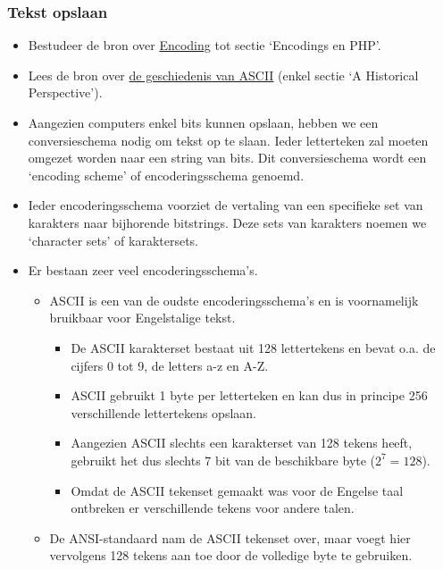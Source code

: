 \documentclass[]{tufte-book}
\providecommand{\tightlist}{%
  \setlength{\itemsep}{0pt}\setlength{\parskip}{0pt}}
\begin{document}
\hypertarget{tekst-opslaan}{%
\subsubsection{Tekst opslaan}\label{tekst-opslaan}}

\begin{itemize}
\tightlist
\item
  Bestudeer de bron over \href{http://kunststube.net/encoding/}{Encoding} tot sectie `Encodings en PHP'.
\item
  Lees de bron over \href{https://www.joelonsoftware.com/2003/10/08/the-absolute-minimum-every-software-developer-absolutely-positively-must-know-about-unicode-and-character-sets-no-excuses/}{de geschiedenis van ASCII} (enkel sectie `A Historical Perspective').
\item
  Aangezien computers enkel bits kunnen opslaan, hebben we een conversieschema nodig om tekst op te slaan. Ieder letterteken zal moeten omgezet worden naar een string van bits. Dit conversieschema wordt een `encoding scheme' of encoderingsschema genoemd.
\item
  Ieder encoderingsschema voorziet de vertaling van een specifieke set van karakters naar bijhorende bitstrings. Deze sets van karakters noemen we `character sets' of karaktersets.
\item
  Er bestaan zeer veel encoderingsschema's.

  \begin{itemize}
  \tightlist
  \item
    ASCII is een van de oudste encoderingsschema's en is voornamelijk bruikbaar voor Engelstalige tekst.

    \begin{itemize}
    \tightlist
    \item
      De ASCII karakterset bestaat uit 128 lettertekens en bevat o.a. de cijfers 0 tot 9, de letters a-z en A-Z.
    \item
      ASCII gebruikt 1 byte per letterteken en kan dus in principe 256 verschillende lettertekens opslaan.
    \item
      Aangezien ASCII slechts een karakterset van 128 tekens heeft, gebruikt het dus slechts 7 bit van de beschikbare byte (\(2^7 = 128\)).
    \item
      Omdat de ASCII tekenset gemaakt was voor de Engelse taal ontbreken er verschillende tekens voor andere talen.
    \end{itemize}
  \item
    De ANSI-standaard nam de ASCII tekenset over, maar voegt hier vervolgens 128 tekens aan toe door de volledige byte te gebruiken.


\end{itemize}
\end{itemize}
\end{document}

